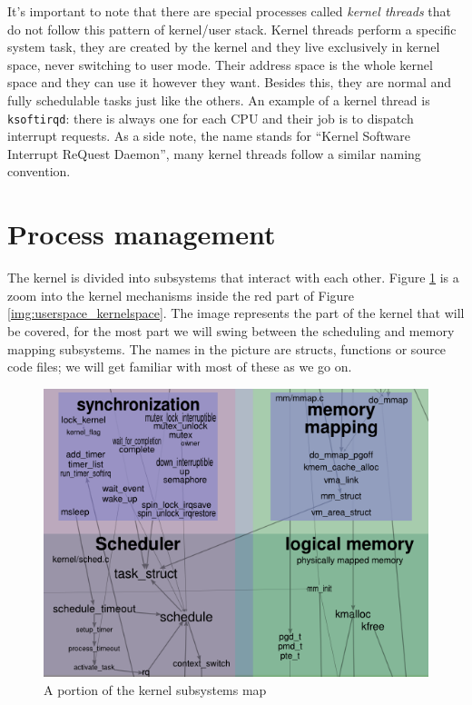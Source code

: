 \documentclass[10pt]{book}
\begin{document}
It's important to note that there are special processes called \textit{kernel threads} that do not follow this pattern of kernel/user stack. Kernel threads perform a specific system task, they are created by the kernel and they live exclusively in kernel space, never switching to user mode. Their address space is the whole kernel space and they can use it however they want. Besides this, they are normal and fully schedulable tasks just like the others. An example of a kernel thread is \verb|ksoftirqd|: there is always one for each CPU and their job is to dispatch interrupt requests. As a side note, the name stands for ``Kernel Software Interrupt ReQuest Daemon'', many kernel threads follow a similar naming convention. 
\section{Process management}
The kernel is divided into subsystems that interact with each other. Figure \ref{img:kernelmap} is a zoom into the kernel mechanisms inside the red part of Figure \ref{img:userspace_kernelspace}. The image represents the part of the kernel that will be covered, for the most part we will swing between the scheduling and memory mapping subsystems. The names in the picture are structs, functions or source code files; we will get familiar with most of these as we go on.

\begin{figure}[ht]
\includegraphics[width=\textwidth]{images/kernelmap.png}
\caption{A portion of the kernel subsystems map}
\label{img:kernelmap}
\end{figure}
\end{document}

